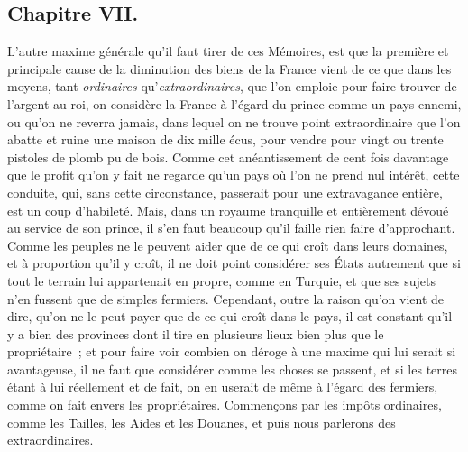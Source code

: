 \documentclass[french,twoside]{book} %
\begin{document}
\subsection[{Chapitre VII.}]{Chapitre VII.}
\noindent L’autre maxime générale qu’il faut tirer de ces Mémoires, est que la première et principale cause de la diminution des biens de la France vient de ce que dans les moyens, tant {\itshape ordinaires} qu’{\itshape extraordinaires}, que l’on emploie pour faire trouver de l’argent au roi, on considère la France à l’égard du prince comme un pays ennemi, ou qu’on ne reverra jamais, dans lequel on ne trouve point extraordinaire que l’on abatte et ruine une maison de dix mille écus, pour vendre pour vingt ou trente pistoles de plomb pu de bois. Comme cet anéantissement de cent fois davantage que le profit qu’on y fait ne regarde qu’un pays où l’on ne prend nul intérêt, cette conduite, qui, sans cette circonstance, passerait pour une extravagance entière, est un coup d’habileté. Mais, dans un royaume tranquille et entièrement dévoué au service de son prince, il s’en faut beaucoup qu’il faille rien faire d’approchant. Comme les peuples ne le peuvent aider que de ce qui croît dans leurs domaines, et à proportion qu’il y croît, il ne doit point considérer ses États autrement que si tout le terrain lui appartenait en propre, comme en Turquie, et que ses sujets n’en fussent que de simples fermiers. Cependant, outre la raison qu’on vient de dire, qu’on ne le peut payer que de ce qui croît dans le pays, il est constant qu’il y a bien des provinces dont il tire en plusieurs lieux bien plus que le propriétaire ; et pour faire voir combien on déroge à une maxime qui lui serait si avantageuse, il ne faut que considérer comme les choses se passent, et si les terres étant à lui réellement et de fait, on en userait de même à l’égard des fermiers, comme on fait envers les propriétaires. Commençons par les impôts ordinaires, comme les Tailles, les Aides et les Douanes, et puis nous parlerons des extraordinaires.\par
\end{document}
